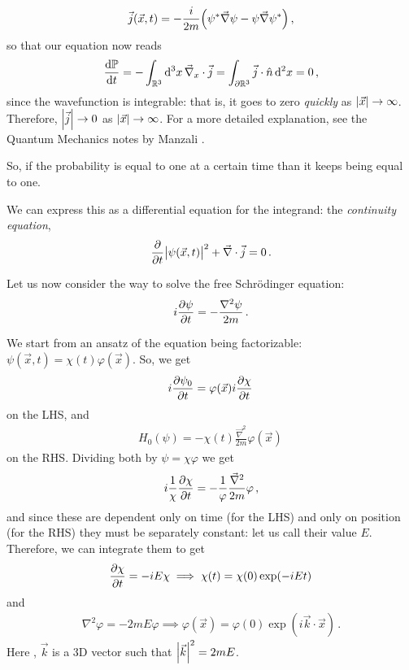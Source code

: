 \documentclass[main.tex]{subfiles}
\begin{document}
%
\begin{align}
\vec{j} (\vec{x}, t) = - \frac{i}{2m} \qty(\psi^{*} \vec{\nabla} \psi - \psi \vec{\nabla} \psi^{*}  )
\,,
\end{align}
%
so that our equation now reads 
%
\begin{align}
\dv{\mathbb{P}}{t} = - \int_{\mathbb{R}^3} \dd[3]{x} \vec{\nabla}_{x} \cdot \vec{j} 
= \int_{\partial \mathbb{R}^3} \vec{j} \cdot \hat{n} \dd[2]{x} = 0
\,,
\end{align}
%
since the wavefunction is integrable: that is, it goes to zero \emph{quickly} as \(\abs{\vec{x}} \rightarrow \infty \). 
Therefore, \(\abs{\vec{j}} \rightarrow 0\) as \(\abs{\vec{x}} \rightarrow \infty \). For a more detailed explanation, see the Quantum Mechanics notes by Manzali \cite[page 147]{manzaliAppuntiDiFisica2019}.

So, if the probability is equal to one at a certain time than it keeps being equal to one. 

We can express this as a differential equation for the integrand: the \emph{continuity equation}, 
%
\begin{align}
\pdv{}{t} \abs{\psi  (\vec{x}, t)}^2 + \vec{\nabla} \cdot \vec{j} = 0
\,.
\end{align}

Let us now consider the way to solve the free Schrödinger equation: 
%
\begin{align}
i \pdv{\psi }{t} = - \frac{\nabla^2 \psi }{2m } 
\,.
\end{align}

We start from an ansatz of the equation being factorizable: \(\psi (\vec{x}, t) = \chi (t) \varphi (\vec{x})\). So, we get 
%
\begin{align}
i \pdv{\psi_{0}}{t} = \varphi (\vec{x}) i \pdv{\chi }{t}
\,
\end{align}
%
on the LHS, and 
%
\begin{align}
H_0 (\psi ) = - \chi (t) \frac{\vec{\nabla}^2}{2m} \varphi (\vec{x})
\,
\end{align}
%
on the RHS. Dividing both by \(\psi = \chi \varphi \) we get 
%
\begin{align}
i \frac{1}{\chi } \pdv{\chi }{t} = - \frac{1}{\varphi } \frac{\vec{\nabla}^2}{2m} \varphi 
\,,
\end{align}
%
and since these are dependent only on time (for the LHS) and only on position (for the RHS) they must be separately constant: let us call their value \(E\). Therefore, we can integrate them to get 
%
\begin{align}
\pdv{\chi }{t} = - i E \chi  \implies \chi (t) = \chi (0) \exp(-iEt)
\,
\end{align}
%
and 
%
\begin{align}
\nabla^2 \varphi = -2 m E \varphi  \implies \varphi (\vec{x}) = \varphi (0) \exp(i \vec{k} \cdot \vec{x})
\,.
\end{align}
%
Here , \(\vec{k}\) is a 3D vector such that \(\abs{\vec{k}}^2 = 2 m E\). 
\end{document}
